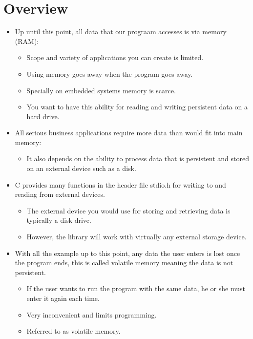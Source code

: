 \section{Overview}
\begin{itemize}
    \item Up until this point, all data that our prograam accesses is via memory (RAM):
        \begin{itemize}
            \item Scope and variety of applications you can create is limited. 
            \item Using memory goes away when the program goes away.
            \item Specially on embedded systems memory is scarce.
            \item You want to have this ability for reading and writing persistent data on a hard drive. 
        \end{itemize}
    
    \item All serious business applications require more data than would fit into main memory:
        \begin{itemize}
            \item It also depends on the ability to process data that is persistent and stored on an external device such as a disk. 
        \end{itemize}
    
    \item C provides many functions in the header file stdio.h for writing to and reading from external devices.
        \begin{itemize}
            \item The external device you would use for storing and retrieving data is typically a disk drive.
            \item However, the library will work with virtually any external storage device.
        \end{itemize}
    
    \item With all the example up to this point, any data the user enters is lost once the program ends, this is called volatile memory meaning the data is not persistent.
        \begin{itemize}
            \item If the user wants to run the program with the same data, he or she must enter it again each time.
            \item Very inconvenient and limits programming.
            \item Referred to as volatile memory.
        \end{itemize}
\end{itemize}

